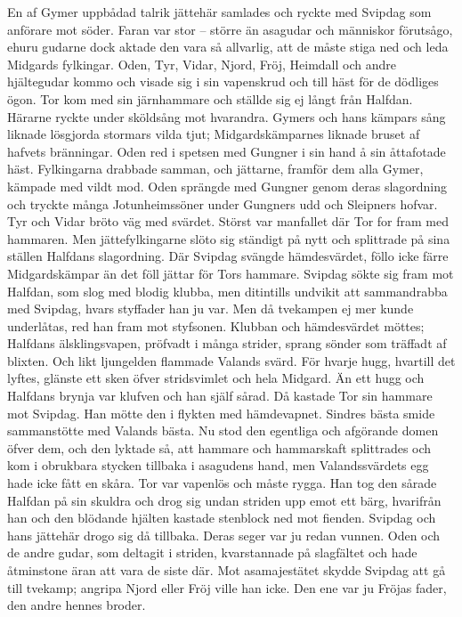 En af Gymer uppbådad talrik jättehär samlades och ryckte med Svipdag som
anförare mot söder. Faran var stor -- större än asagudar och människor
förutsågo, ehuru gudarne dock aktade den vara så allvarlig, att de måste
stiga ned och leda Midgards fylkingar. Oden, Tyr, Vidar, Njord, Fröj,
Heimdall och andre hjältegudar kommo och visade sig i sin vapenskrud och
till häst för de dödliges ögon. Tor kom med sin järnhammare och ställde
sig ej långt från Halfdan. Härarne ryckte under sköldsång mot hvarandra.
Gymers och hans kämpars sång liknade lösgjorda stormars vilda tjut;
Midgardskämparnes liknade bruset af hafvets bränningar. Oden red i
spetsen med Gungner i sin hand å sin åttafotade häst. Fylkingarna
drabbade samman, och jättarne, framför dem alla Gymer, kämpade med vildt
mod. Oden sprängde med Gungner genom deras slagordning och tryckte många
Jotunheimssöner under Gungners udd och Sleipners hofvar. Tyr och Vidar
bröto väg med svärdet. Störst var manfallet där Tor for fram med
hammaren. Men jättefylkingarne slöto sig ständigt på nytt och splittrade
på sina ställen Halfdans slagordning. Där Svipdag svängde hämdesvärdet,
föllo icke färre Midgardskämpar än det föll jättar för Tors hammare.
Svipdag sökte sig fram mot Halfdan, som slog med blodig klubba, men
ditintills undvikit att sammandrabba med Svipdag, hvars styffader han ju
var. Men då tvekampen ej mer kunde underlåtas, red han fram mot
styfsonen. Klubban och hämdesvärdet möttes; Halfdans älsklingsvapen,
pröfvadt i många strider, sprang sönder som träffadt af blixten. Och
likt ljungelden flammade Valands svärd. För hvarje hugg, hvartill det
lyftes, glänste ett sken öfver stridsvimlet och hela Midgard. Än ett
hugg och Halfdans brynja var klufven och han själf sårad. Då kastade Tor
sin hammare mot Svipdag. Han mötte den i flykten med hämdevapnet.
Sindres bästa smide sammanstötte med Valands bästa. Nu stod den
egentliga och afgörande domen öfver dem, och den lyktade så, att hammare
\protect\hypertarget{lb1625905.xhtmlux5cux23start124}{}{}\protect\hypertarget{lb1625905.xhtmlux5cux23start124-a}{}{}\protect\hypertarget{lb1625905.xhtmlux5cux23start124-b}{}{}\protect\hypertarget{lb1625905.xhtmlux5cux23start124-c}{}{}\protect\hypertarget{lb1625905.xhtmlux5cux23start124-d}{}{}
och hammarskaft splittrades och kom i obrukbara stycken tillbaka i
asagudens hand, men Valandssvärdets egg hade icke fått en skåra. Tor var
vapenlös och måste rygga. Han tog den sårade Halfdan på sin skuldra och
drog sig undan striden upp emot ett bärg, hvarifrån han och den blödande
hjälten kastade stenblock ned mot fienden. Svipdag och hans jättehär
drogo sig då tillbaka. Deras seger var ju redan vunnen. Oden och de
andre gudar, som deltagit i striden, kvarstannade på slagfältet och hade
åtminstone äran att vara de siste där. Mot asamajestätet skydde Svipdag
att gå till tvekamp; angripa Njord eller Fröj ville han icke. Den ene
var ju Fröjas fader, den andre hennes broder.

